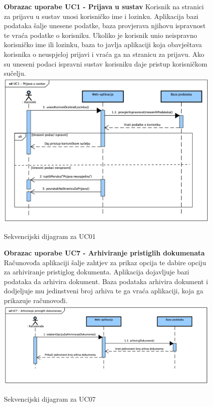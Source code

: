 				\begin{figure}[H]
					\textbf{Obrazac uporabe UC1 - Prijava u sustav}
					\newline
					Korisnik na stranici za prijavu u sustav unosi korisničko ime i lozinku. Aplikacija bazi podataka šalje unesene podatke, baza provjerava njihovu ispravnost te vraća podatke o korisniku. Ukoliko je korisnik unio neispravno
					korisničko ime ili lozinku, baza to javlja aplikaciji koja obavještava korisnika o neuspjeloj prijavi i vraća ga na stranicu za prijavu. Ako su uneseni podaci ispravni sustav korisniku daje pristup korisničkom sučelju.
					\newline
					\includegraphics[width=\textwidth]{slike/Sequence_UC01.png}
					\caption{Sekvencijski dijagram za UC01}
					\label{fig:sequence_UC01}
				\end{figure}

				\begin{figure}[H]
					\textbf{Obrazac uporabe UC7 - Arhiviranje pristiglih dokumenata}
					\newline
					Računovođa aplikaciji šalje zahtjev za prikaz opcija te dabire opciju za arhiviranje pristiglog dokumenta. Aplikacija dojavljuje bazi podataka da arhivira dokument.
					Baza podataka arhivira dokument i dodjeljuje mu jedinstveni broj arhiva te ga vraća aplikaciji, koja ga prikazuje računovođi.
					\newline
					\includegraphics[width=\textwidth]{slike/Sequence_UC07.png}
					\caption{Sekvencijski dijagram za UC07}
					\label{fig:sequence_UC07}
				\end{figure}

